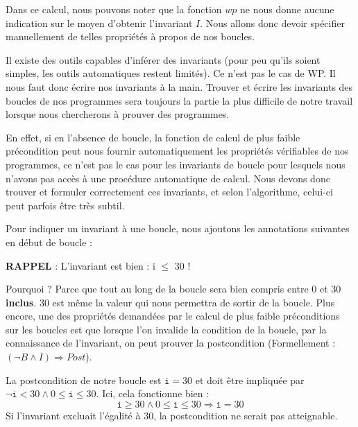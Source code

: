 Dans ce calcul, nous pouvons noter que la fonction $wp$ ne nous donne aucune
indication sur le moyen d'obtenir l'invariant $I$. Nous allons donc devoir
spécifier manuellement de telles propriétés à propos de nos boucles.





Il existe des outils capables d'inférer des invariants (pour peu qu'ils soient
simples, les outils automatiques restent limités). Ce n'est pas le cas de WP.
Il nous faut donc écrire nos invariants à la main. Trouver et écrire les
invariants des boucles de nos programmes sera toujours la partie la plus difficile
de notre travail lorsque nous chercherons à prouver des programmes.



En effet, si en l'absence de boucle, la fonction de calcul de plus faible
précondition peut nous fournir automatiquement les propriétés vérifiables de nos
programmes, ce n'est pas le cas pour les invariants de boucle pour lesquels
nous n'avons pas accès à une procédure automatique de calcul. Nous devons donc
trouver et formuler correctement ces invariants, et selon l'algorithme, celui-ci
peut parfois être très subtil.



Pour indiquer un invariant à une boucle, nous ajoutons les annotations suivantes
en début de boucle :






\begin{Warning}
\textbf{RAPPEL} : L'invariant est bien : i \textbf{$\leq$} 30 !
\end{Warning}


Pourquoi ? Parce que tout au long de la boucle  sera bien compris entre
0 et 30 \textbf{inclus}. 30 est même la valeur qui nous permettra de sortir de la
boucle. Plus encore, une des propriétés demandées par le calcul de plus faible
préconditions sur les boucles est que lorsque l'on invalide la condition de la
boucle, par la connaissance de l'invariant, on peut prouver la postcondition
(Formellement : $(\neg B \wedge I) \Rightarrow Post$).



La postcondition de notre boucle est $\texttt{i} = 30$ et doit être impliquée par
$\neg \texttt{i} < 30 \wedge 0 \leq \texttt{i} \leq 30$. Ici, cela fonctionne
bien :
$$\texttt{i} \geq 30 \wedge 0 \leq \texttt{i} \leq 30 \Rightarrow \texttt{i} = 30$$
Si l'invariant excluait l'égalité à 30, la postcondition ne serait pas atteignable.



